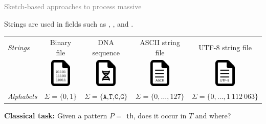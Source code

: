 \begin{frame}{\textcolor{gray}{Sketch-based approaches to process massive }}
    
    \small
    Strings are used in fields such as , , and .\pause

    \medskip
    \begin{tabular}{l  c c c c}
        \emph{Strings} & Binary file & DNA sequence & ASCII string file & UTF-8 string file \\
        \rule{0pt}{10ex}    
        &
        \includegraphics[width=1cm]{pictures/file-bin.png}&
        \includegraphics[width=1cm]{pictures/file-dna.png}&
        \includegraphics[width=1cm]{pictures/file-ascii.png}&
        \includegraphics[width=1cm]{pictures/file-utf-8.png}
        \\
        \rule{0pt}{4ex}  
        \emph{Alphabets} & $\Sigma=\{0,1\}$ & $\Sigma=\{\texttt{A,T,C,G}\}$ & $\Sigma=\{0,\dots , 127\}$ & $\Sigma = \{0, \dots, 1~112~063\}$\\
    \end{tabular}\pause
    \bigskip

    \textbf{Classical task:} \pause Given a pattern $P =$ \texttt{th}, does it occur in  $T$ and where?
    
    \begin{center}
        \\
    \end{center}

\end{frame}

